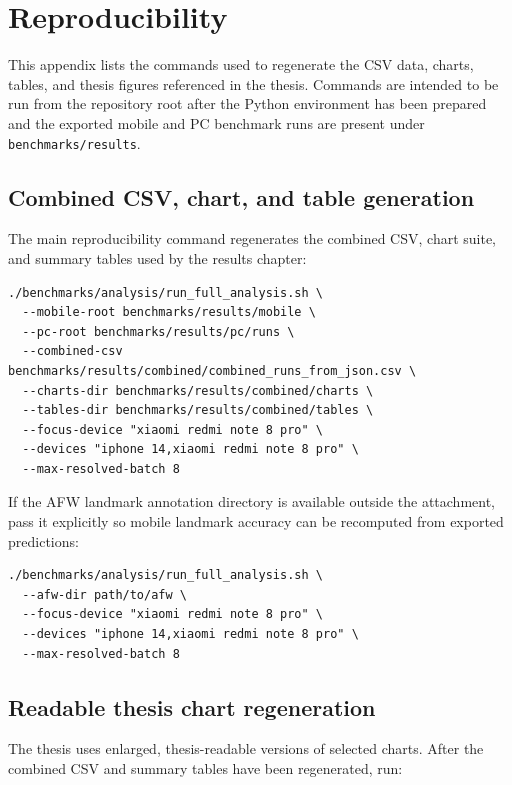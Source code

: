 \chapter{Reproducibility}

This appendix lists the commands used to regenerate the CSV data, charts, tables,
and thesis figures referenced in the thesis. Commands are intended to be run from
the repository root after the Python environment has been prepared and the
exported mobile and PC benchmark runs are present under
\texttt{benchmarks/results}.

\section{Combined CSV, chart, and table generation}

The main reproducibility command regenerates the combined CSV, chart suite, and
summary tables used by the results chapter:

\begin{verbatim}
./benchmarks/analysis/run_full_analysis.sh \
  --mobile-root benchmarks/results/mobile \
  --pc-root benchmarks/results/pc/runs \
  --combined-csv benchmarks/results/combined/combined_runs_from_json.csv \
  --charts-dir benchmarks/results/combined/charts \
  --tables-dir benchmarks/results/combined/tables \
  --focus-device "xiaomi redmi note 8 pro" \
  --devices "iphone 14,xiaomi redmi note 8 pro" \
  --max-resolved-batch 8
\end{verbatim}

If the AFW landmark annotation directory is available outside the attachment,
pass it explicitly so mobile landmark accuracy can be recomputed from exported
predictions:

\begin{verbatim}
./benchmarks/analysis/run_full_analysis.sh \
  --afw-dir path/to/afw \
  --focus-device "xiaomi redmi note 8 pro" \
  --devices "iphone 14,xiaomi redmi note 8 pro" \
  --max-resolved-batch 8
\end{verbatim}

\section{Readable thesis chart regeneration}

The thesis uses enlarged, thesis-readable versions of selected charts. After the
combined CSV and summary tables have been regenerated, run:

